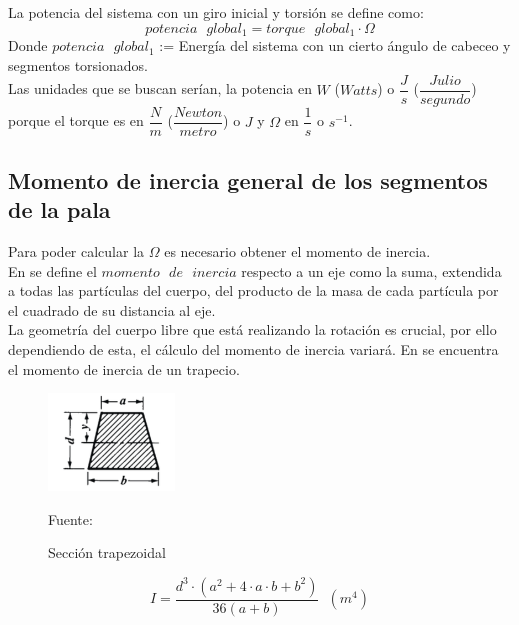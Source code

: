   La potencia del sistema con un giro inicial y torsión se define como:
   \begin{equation}
  potencia \text{ } global_1 = torque \text{ } global_1 \cdot \Omega  
 \label{def:potencia_giro_segmentos}
 \end{equation}
  Donde $potencia \text{ } global_1$ := Energía del sistema con un cierto ángulo de cabeceo y segmentos torsionados.\\
 
Las unidades que se buscan serían, la potencia en $W$ ($Watts$) o $\dfrac{J}{s}$ ($\dfrac{Julio}{segundo}$) porque el torque es en $\dfrac{N}{m}$ ($\dfrac{Newton}{metro}$) o $J$ y $\Omega$ en $\dfrac{1}{s}$ o $s^{-1}$.

 
\subsection{Momento de inercia general de los segmentos de la pala}

Para poder calcular la $\Omega$ es necesario obtener el momento de inercia.\\

En \cite[p.~269]{goldstein1987mecanica} se define el $momento \text{ } de \text{ } inercia$ respecto a un eje como la suma, extendida a todas las partículas del cuerpo, del producto de la masa de cada partícula por el cuadrado de su distancia al eje.\\


La geometría del cuerpo libre que está realizando la rotación es crucial, por ello dependiendo de esta, el cálculo del momento de inercia variará. En \cite[p.~242]{oberg2012machinery} se encuentra el momento de inercia de un trapecio. \\


\begin{figure}[H]
    \centering
    \includegraphics[width=0.3\textwidth]{images/trapecio libro machinery.png}
    \caption{Sección trapezoidal}
    Fuente: \cite[p.~242]{oberg2012machinery}
    \label{fig:momento_inercia_libro}
\end{figure}



\begin{equation}
    I = \dfrac{ d^3 \cdot (a^2 + 4 \cdot a \cdot b + b^2)}{ 36 (a + b)} \hspace{7pt} (m^4) 
\end{equation}




